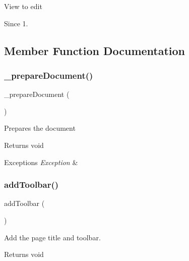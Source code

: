 View to edit

\begin{DoxySince}{Since}
1. 
\end{DoxySince}


\subsection{Member Function Documentation}
\mbox{\label{classtks__agenda_view_newsitem_aa6beb02534f5e57801141ad50e7adec5}} 
\subsubsection{\+\_\+prepare\+Document()}
{\footnotesize\ttfamily \+\_\+prepare\+Document (\begin{DoxyParamCaption}{ }\end{DoxyParamCaption})\hspace{0.3cm}{\ttfamily [protected]}}

Prepares the document

\begin{DoxyReturn}{Returns}
void
\end{DoxyReturn}

\begin{DoxyExceptions}{Exceptions}
{\em Exception} & \\
\hline
\end{DoxyExceptions}
\mbox{\label{classtks__agenda_view_newsitem_af327e89538be614e923c7e5863319f43}} 
\subsubsection{add\+Toolbar()}
{\footnotesize\ttfamily add\+Toolbar (\begin{DoxyParamCaption}{ }\end{DoxyParamCaption})\hspace{0.3cm}{\ttfamily [protected]}}

Add the page title and toolbar.

\begin{DoxyReturn}{Returns}
void
\end{DoxyReturn}

